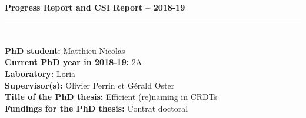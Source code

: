 \documentclass[12pt]{article}
\newcommand{\commentaire}[1]{}
\begin{document}

\bigskip

\centerline{\Large\textbf{Progress Report and CSI Report -- 2018-19}}
\bigskip
\bigskip

\commentaire{%
This report contains 4 parts to be filled in French or English:\\
  -- an administrative form, to be filled by the PhD student\\
  -- the progress report of the PhD thesis, to be filled by the PhD
  student\\
  -- the conclusion of the supervisors\\
  -- the report of the Comit\'e de Suivi Individuel (CSI), to be
  filled by the CSI\\}

\commentaire{%
For the 4th part, the PhD student must plan a meeting with the
“r\'ef\'erent scientifique” (first member of his/her CSI) in May. The
goal of this meeting is to discuss the progress of the
thesis. Prior to this meeting, the other parts must be filled and
the full document e-mailed to the r\'ef\'erent scientifique.\\}

\commentaire{%
At the end of this meeting, the report is to be signed by both
members of the CSI, and sent by the CSI to the PhD student, the
supervisors and the CMI Doctoral school
(francoise.laurent@loria.fr). It is then to be uploaded by the PhD
student to her/his ADUM profile.\\}

\commentaire{%
\textcolor{red}{In order to facilitate the process, the different parts can be
prepared and signed (electronically) as separate documents, but
they must be merged again as a single pdf file for uploading to
ADUM.}}

\bigskip
\hrule

\section*{}

\noindent\textbf{PhD student:}
Matthieu Nicolas
\\
\noindent\textbf{Current PhD year in 2018-19:}
2A
\\
\noindent\textbf{Laboratory:}
Loria
\\
\noindent\textbf{Supervisor(s):}
Olivier Perrin et Gérald Oster
\\
\noindent\textbf{Title of the PhD thesis:}
Efficient (re)naming in \acp{CRDT}
\\
\noindent\textbf{Fundings for the PhD thesis:}
Contrat doctoral
\\
\end{document}
